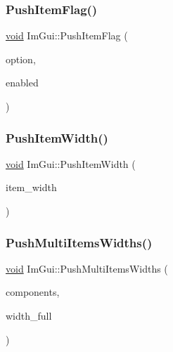 \mbox{\label{namespaceImGui_ac7301f6378333f6d17f47823eed9e00a}} 
\subsubsection{\texorpdfstring{Push\+Item\+Flag()}{PushItemFlag()}}
{\footnotesize\ttfamily \hyperlink{imgui__impl__opengl3__loader_8h_ac668e7cffd9e2e9cfee428b9b2f34fa7}{void} Im\+Gui\+::\+Push\+Item\+Flag (\begin{DoxyParamCaption}\item[{\hyperlink{imgui__internal_8h_abcf9eafab4557e911b2c0d8fe2feeb38}{Im\+Gui\+Item\+Flags}}]{option,  }\item[{bool}]{enabled }\end{DoxyParamCaption})}

\mbox{\label{namespaceImGui_a4ad13bf38f0521a339133248ef3e3036}} 
\subsubsection{\texorpdfstring{Push\+Item\+Width()}{PushItemWidth()}}
{\footnotesize\ttfamily \hyperlink{imgui__impl__opengl3__loader_8h_ac668e7cffd9e2e9cfee428b9b2f34fa7}{void} Im\+Gui\+::\+Push\+Item\+Width (\begin{DoxyParamCaption}\item[{float}]{item\+\_\+width }\end{DoxyParamCaption})}

\mbox{\label{namespaceImGui_a6ec35a6af1a0bbe454d79c2c63b030cc}} 
\subsubsection{\texorpdfstring{Push\+Multi\+Items\+Widths()}{PushMultiItemsWidths()}}
{\footnotesize\ttfamily \hyperlink{imgui__impl__opengl3__loader_8h_ac668e7cffd9e2e9cfee428b9b2f34fa7}{void} Im\+Gui\+::\+Push\+Multi\+Items\+Widths (\begin{DoxyParamCaption}\item[{int}]{components,  }\item[{float}]{width\+\_\+full }\end{DoxyParamCaption})}

